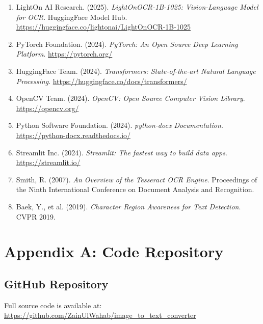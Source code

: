 \documentclass[12pt,a4paper]{article}
\begin{document}
\begin{enumerate}
    \item LightOn AI Research. (2025). \textit{LightOnOCR-1B-1025: Vision-Language Model for OCR}. HuggingFace Model Hub. \url{https://huggingface.co/lightonai/LightOnOCR-1B-1025}
    
    \item PyTorch Foundation. (2024). \textit{PyTorch: An Open Source Deep Learning Platform}. \url{https://pytorch.org/}
    
    \item HuggingFace Team. (2024). \textit{Transformers: State-of-the-art Natural Language Processing}. \url{https://huggingface.co/docs/transformers/}
    
    \item OpenCV Team. (2024). \textit{OpenCV: Open Source Computer Vision Library}. \url{https://opencv.org/}
    
    \item Python Software Foundation. (2024). \textit{python-docx Documentation}. \url{https://python-docx.readthedocs.io/}
    
    \item Streamlit Inc. (2024). \textit{Streamlit: The fastest way to build data apps}. \url{https://streamlit.io/}
    
    \item Smith, R. (2007). \textit{An Overview of the Tesseract OCR Engine}. Proceedings of the Ninth International Conference on Document Analysis and Recognition.
    
    \item Baek, Y., et al. (2019). \textit{Character Region Awareness for Text Detection}. CVPR 2019.
\end{enumerate}

\newpage

\section*{Appendix A: Code Repository}

\subsection*{GitHub Repository}
Full source code is available at: \url{https://github.com/ZainUlWahab/image_to_text_converter}
\end{document}

